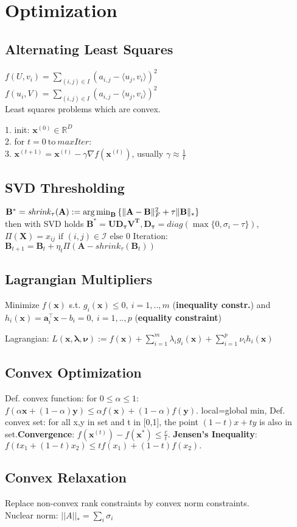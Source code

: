 \section{Optimization}

\subsection*{Alternating Least Squares}
$f(U,v_i)=\sum_{(i,j)\in I} (a_{i,j} - \langle u_j, v_i \rangle)^2$\\
$f(u_i,V)=\sum_{(i,j)\in I} (a_{i,j} - \langle u_j, v_i \rangle)^2$\\
Least squares problems which are convex.


1. init: $\mathbf{x}^{(0)} \in \mathbb{R}^D$\\
2. for $t = 0 \ \text{to} \ \mathit{maxIter}$:\\
3. $\mathbf{x}^{(t+1)} = \mathbf{x}^{(t)} - \gamma \nabla f(\mathbf{x}^{(t)})$, usually $\gamma \approx \frac{1}{t}$

\subsection*{SVD Thresholding}
$\mathbf{B}^{*}=\mathit{shrink}_\tau(\mathbf{A}):=\operatorname*{arg\,min}_{\mathbf{B}}{\{\|\mathbf{A-B}\|^2_F + \tau\|\mathbf{B}\|_{*}\}}$\\
then with SVD holds $\mathbf{B^*=UD_\tau V^T, D_\tau} = \mathit{diag}(\max\{0,\sigma_i - \tau\})$,
$\Pi(\mathbf{X}) = x_{ij} \text{ if } (i,j) \in \mathcal{I} \text{ else } 0$ Iteration: $\mathbf{B}_{t+1}=\mathbf{B}_t + \eta_t \Pi(\mathbf{A} - \mathit{shrink}_\tau(\mathbf{B}_t))$
\subsection*{Lagrangian Multipliers}
Minimize  $f(\mathbf{x})$ s.t. $g_i(\mathbf{x}) \leq 0,\ i = 1, .., m$ (\textbf{inequality constr.}) and $h_i(\mathbf{x}) = \mathbf{a}_i^\top \mathbf{x} - b_i = 0,\ i = 1, .., p$ (\textbf{equality constraint})
\begin{compactdesc}
	\item[Lagrangian:] $L(\mathbf{x}, \boldsymbol{\lambda}, \boldsymbol{\nu}) := f(\mathbf{x}) + \sum_{i=1}^m \lambda_i g_i(\mathbf{x}) + \sum_{i=1}^p \nu_i h_i(\mathbf{x})$
\end{compactdesc}

\subsection*{Convex Optimization}
Def. convex function: for $0 \leq \alpha \leq 1$: $f(\alpha \mathbf{x} + (1 - \alpha)\mathbf{y}) \leq \alpha f(\mathbf{x}) + (1-\alpha)f(\mathbf{y})$. local=global min, Def. convex set: for all x,y in set and t in [0,1], the point $(1-t)x + ty$ is also in set.\textbf{Convergence}: $f(\mathbf{x}^{(t)}) - f(\mathbf{x}^*) \le \frac{c}{t}$.
\textbf{Jensen's Inequality}: $f(tx_{1}+(1-t)x_{2})\leq tf(x_{1})+(1-t)f(x_{2}).$


\subsection*{Convex Relaxation}
Replace non-convex rank constraints by convex norm constraints.\\
Nuclear norm: $||A||_* = \sum_i \sigma_i$
